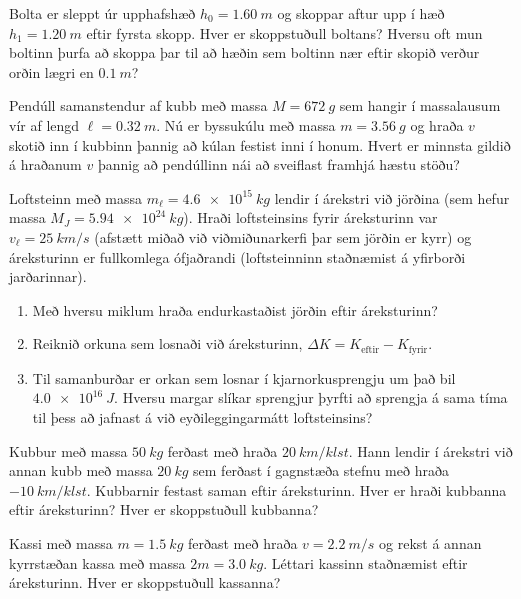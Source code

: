\ifdefined \wholebook \else\documentclass[oneside]{book}\usepackage{EdlBook}\graphicspath{{figures/}}
\begin{document}
\begin{enumerate}[label = \textbf{Dæmi \thechapter.\arabic*.}]
\begin{minipage}{\linewidth}
\item Bolta er sleppt úr upphafshæð $h_0 = \SI{1.60}{m}$ og skoppar aftur upp í hæð $h_1 = \SI{1.20}{m}$ eftir fyrsta skopp. Hver er skoppstuðull boltans? Hversu oft mun boltinn þurfa að skoppa þar til að hæðin sem boltinn nær eftir skopið verður orðin lægri en $\SI{0.1}{m}$?

\item Pendúll samanstendur af kubb með massa $M = \SI{672}{g}$ sem hangir í massalausum vír af lengd $\ell = \SI{0.32}{m}$. Nú er byssukúlu með massa $m = \SI{3.56}{g}$ og hraða $v$ skotið inn í kubbinn þannig að kúlan festist inni í honum. Hvert er minnsta gildið á hraðanum $v$ þannig að pendúllinn nái að sveiflast framhjá hæstu stöðu?


\item Loftsteinn með massa $m_\ell = \SI{4.6e15}{kg}$ lendir í árekstri við jörðina (sem hefur massa $M_J = \SI{5.94e24}{kg}$). Hraði loftsteinsins fyrir áreksturinn var $v_\ell = \SI{25}{km/s}$ (afstætt miðað við viðmiðunarkerfi þar sem jörðin er kyrr) og áreksturinn er fullkomlega ófjaðrandi (loftsteinninn staðnæmist á yfirborði jarðarinnar).

\end{minipage}

\begin{enumerate}[label = \textbf{(\alph*)}]
    \item Með hversu miklum hraða endurkastaðist jörðin eftir áreksturinn?
    
    \item Reiknið orkuna sem losnaði við áreksturinn, $\Delta K = K_{\text{eftir}} - K_{\text{fyrir}}$.
    
    \item Til samanburðar er orkan sem losnar í kjarnorkusprengju um það bil $\SI{4.0e16}{J}$. Hversu margar slíkar sprengjur þyrfti að sprengja á sama tíma til þess að jafnast á við eyðileggingarmátt loftsteinsins? 
\end{enumerate}

\item Kubbur með massa $\SI{50}{kg}$ ferðast með hraða $\SI{20}{km/klst}$. Hann lendir í árekstri við annan kubb með massa $\SI{20}{kg}$ sem ferðast í gagnstæða stefnu með hraða $-\SI{10}{km/klst}$. Kubbarnir festast saman eftir áreksturinn. Hver er hraði kubbanna eftir áreksturinn? Hver er skoppstuðull kubbanna?

\item Kassi með massa $m = \SI{1.5}{kg}$ ferðast með hraða $v = \SI{2.2}{m/s}$ og rekst á annan kyrrstæðan kassa með massa $2m = \SI{3.0}{kg}$. Léttari kassinn staðnæmist eftir áreksturinn. Hver er skoppstuðull kassanna?


\end{enumerate}
\end{document}

